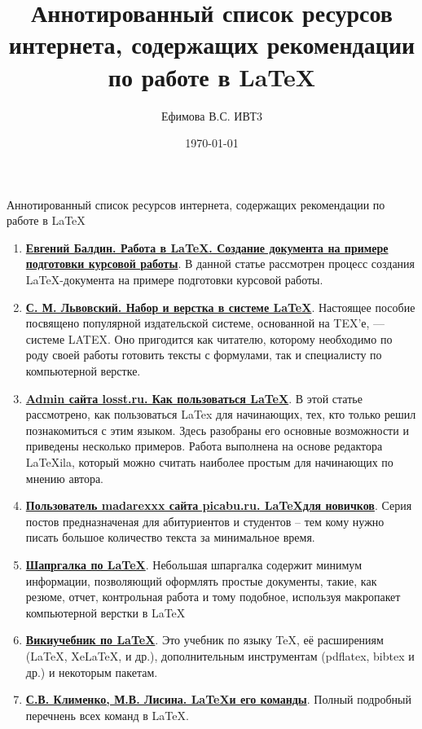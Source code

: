 \documentclass[a4paper,12pt]{article} %
\author{Ефимова В.С. ИВТ3}
\title{Аннотированный список ресурсов интернета, содержащих рекомендации по работе в \LaTeX}
\date{\today}
\begin{document}
\maketitle
\newpage
\begin{center}
{\Large Аннотированный список ресурсов интернета, содержащих рекомендации по работе в \LaTeX}
\end{center}
\begin{enumerate}
\item \href{https://www.ibm.com/developerworks/ru/library/latex_tutorial_01/index.html}{\textbf{Евгений Балдин. Работа в \LaTeX . Создание документа на примере подготовки курсовой работы}}. В данной статье рассмотрен процесс создания \LaTeX -документа на примере подготовки курсовой работы.
\item \href{https://www.intuit.ru/sites/default/files/documents/needhelp/LaTeX.pdf}{\textbf{С. М. Львовский. Набор и верстка в системе \LaTeX}}. Настоящее пособие посвящено популярной издательской системе,
основанной на TEX’е, — системе LATEX. Оно пригодится как читателю, которому необходимо по роду своей работы готовить тексты с формулами,
так и специалисту по компьютерной верстке.
\item \href{https://losst.ru/kak-polzovatsya-latex}{\textbf{Admin сайта losst.ru. Как пользоваться \LaTeX}}. В этой статье рассмотрено, как пользоваться LaTex для начинающих, тех, кто только решил познакомиться с этим языком. Здесь разобраны его основные возможности и приведены несколько примеров. Работа выполнена на основе редактора LaTeXila, который можно считать наиболее простым для начинающих по мнению автора.
\item \href{https://pikabu.ru/story/latex_dlya_novichkov_vvedenie_4999494}{\textbf{Пользователь madarexxx сайта picabu.ru. \LaTeX для новичков}}. Серия постов предназначеная для абитуриентов и студентов -- тем кому нужно писать большое количество текста за минимальное время.
\item \href{https://wch.github.io/latexsheet/}{\textbf{Шапргалка по \LaTeX}}. Небольшая шпаргалка содержит минимум информации, позволяющий оформлять простые документы, такие, как резюме, отчет, контрольная работа и тому подобное, используя макропакет компьютерной верстки в \LaTeX
\item \href{https://ru.wikibooks.org/wiki/LaTeX}{\textbf{Викиучебник по \LaTeX}}. Это учебник по языку \TeX, её расширениям (\LaTeX, XeLaTeX, и др.), дополнительным инструментам (pdflatex, bibtex и др.) и некоторым пакетам.
\item \href{http://herba.msu.ru/shipunov/software/tex/catlatex.pdf}{\textbf{С.В. Клименко, М.В. Лисина. \LaTeX и его команды}}. Полный подробный перечнень всех команд в \LaTeX .

\end{enumerate}  
\end{document}
